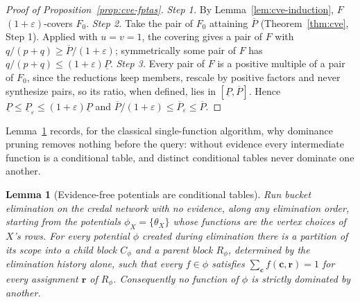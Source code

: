 \documentclass{article} %
\newtheorem{lemma}{Lemma}
\begin{document}
\begin{proof}[Proof of Proposition~\ref{prop:cve-fptas}]
\emph{Step 1.} By Lemma~\ref{lem:cve-induction}, $F$ $(1+\varepsilon)$-covers $F_0$.
\emph{Step 2.} Take the pair of $F_0$ attaining $\overline{P}$ (Theorem~\ref{thm:cve},
Step 1). Applied with $u=v=1$, the covering gives a pair of $F$ with
$q/(p+q)\ge\overline{P}/(1+\varepsilon)$; symmetrically some pair of $F$ has
$q/(p+q)\le(1+\varepsilon)\underline{P}$. \emph{Step 3.} Every pair of $F$ is a positive
multiple of a pair of $F_0$, since the reductions keep members, rescale by positive factors
and never synthesize pairs, so its ratio, when defined, lies in
$[\underline{P},\overline{P}]$. Hence $\underline{P}\le\underline{P}_\varepsilon\le
(1+\varepsilon)\underline P$ and $\overline{P}/(1+\varepsilon)\le\overline{P}_\varepsilon\le
\overline{P}$.
\end{proof}

Lemma~\ref{lem:cvecond} records, for the classical single-function algorithm, why
dominance pruning removes nothing before the query: without evidence every intermediate
function is a conditional table, and distinct conditional tables never dominate one
another.

\begin{lemma}[Evidence-free potentials are conditional tables]\label{lem:cvecond}
Run bucket elimination on the credal network with no evidence, along any
elimination order, starting from the potentials
$\phi_X=\{\theta_X\}$ whose functions are the vertex choices of $X$'s
rows. For every potential $\phi$ created during elimination there is a
partition of its scope into a \emph{child block} $C_\phi$ and a \emph{parent block}
$R_\phi$, determined by the elimination history alone, such that every $f\in\phi$
satisfies $\sum_{\mathbf c}f(\mathbf c,\mathbf r)=1$ for every assignment $\mathbf r$
of $R_\phi$. Consequently no function of $\phi$ is strictly dominated by another.
\end{lemma}
\end{document}
